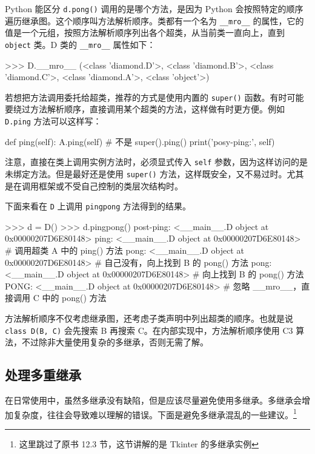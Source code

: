 Python 能区分 \texttt{d.pong()} 调用的是哪个方法，是因为 Python 会按照特定的顺序遍历继承图。这个顺序叫方法解析顺序。类都有一个名为 \texttt{\_\_mro\_\_} 的属性，它的值是一个元组，按照方法解析顺序列出各个超类，从当前类一直向上，直到 \texttt{object} 类。D 类的 \texttt{\_\_mro\_\_} 属性如下：

\begin{python}
>>> D.__mro__
(<class 'diamond.D'>, <class 'diamond.B'>, <class 'diamond.C'>, <class 'diamond.A'>, <class 'object'>)
\end{python}

若想把方法调用委托给超类，推荐的方式是使用内置的 \texttt{super()} 函数。有时可能要绕过方法解析顺序，直接调用某个超类的方法，这样做有时更方便。例如 \texttt{D.ping} 方法可以这样写：

\begin{python}
def ping(self):
    A.ping(self)    # 不是 super().ping()
    print('posy-ping:', self)
\end{python}

注意，直接在类上调用实例方法时，必须显式传入 \texttt{self} 参数，因为这样访问的是未绑定方法。但是最好还是使用 \texttt{super()} 方法，这样既安全，又不易过时。尤其是在调用框架或不受自己控制的类层次结构时。

下面来看在 \texttt{D} 上调用 \texttt{pingpong} 方法得到的结果。

\begin{python}
>>> d = D()
>>> d.pingpong()
post-ping: <__main__.D object at 0x00000207D6E80148>    
ping: <__main__.D object at 0x00000207D6E80148>     # 调用超类 A 中的 ping() 方法
pong: <__main__.D object at 0x00000207D6E80148>     # 自己没有，向上找到 B 的 pong() 方法
pong: <__main__.D object at 0x00000207D6E80148>     # 向上找到 B 的 pong() 方法
PONG: <__main__.D object at 0x00000207D6E80148>     # 忽略 __mro__，直接调用 C 中的 pong() 方法
\end{python}

方法解析顺序不仅考虑继承图，还考虑子类声明中列出超类的顺序。也就是说 \texttt{class D(B, C)} 会先搜索 B 再搜索 C。在内部实现中，方法解析顺序使用 C3 算法，不过除非大量使用复杂的多继承，否则无需了解。

\subsection{处理多重继承}

在日常使用中，虽然多继承没有缺陷，但是应该尽量避免使用多继承。多继承会增加复杂度，往往会导致难以理解的错误。下面是避免多继承混乱的一些建议。\footnote{这里跳过了原书 12.3 节，这节讲解的是 Tkinter 的多继承实例}


